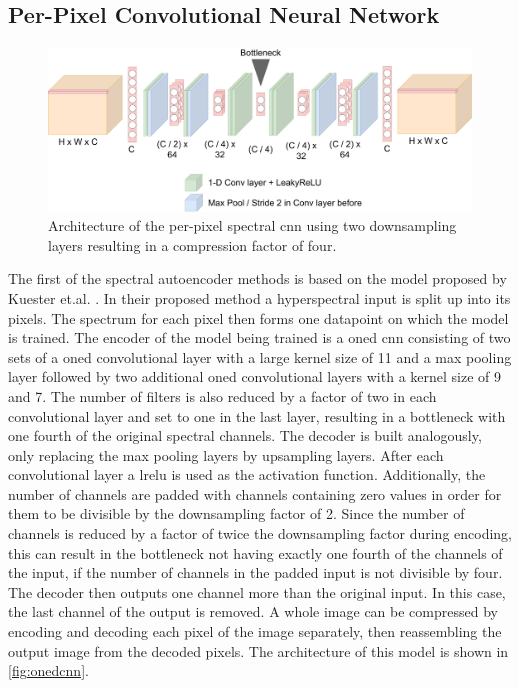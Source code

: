 \subsection{Per-Pixel Convolutional Neural Network\label{sec:conv1d}}
\begin{figure}
\centering
\includegraphics[scale=0.18]{img/OneDCNN.pdf}
\caption[Per-Pixel spectral \ac{cnn}]{Architecture of the per-pixel spectral \ac{cnn} using two downsampling layers resulting in a compression factor of four.}
\label{fig:onedcnn}
\end{figure}
The first of the spectral autoencoder methods is based on the model proposed by Kuester et.al. \citep{kuester_1d-convolutional_2021,kuester_transferability_2022}. In their proposed method a hyperspectral input is split up into its pixels. The spectrum for each pixel then forms one datapoint on which the model is trained. The encoder of the model being trained is a \ac{oned} \ac{cnn} consisting of two sets of a \ac{oned} convolutional layer with a large kernel size of 11 and a max pooling layer followed by two additional \ac{oned} convolutional layers with a kernel size of 9 and 7. The number of filters is also reduced by a factor of two in each convolutional layer and set to one in the last layer, resulting in a bottleneck with one fourth of the original spectral channels. The decoder is built analogously, only replacing the max pooling layers by upsampling layers. After each convolutional layer a \ac{lrelu} is used as the activation function. Additionally, the number of channels are padded with channels containing zero values in order for them to be divisible by the downsampling factor of 2. Since the number of channels is reduced by a factor of twice the downsampling factor during encoding, this can result in the bottleneck not having exactly one fourth of the channels of the input, if the number of channels in the padded input is not divisible by four. The decoder then outputs one channel more than the original input. In this case, the last channel of the output is removed. A whole image can be compressed by encoding and decoding each pixel of the image separately, then reassembling the output image from the decoded pixels. The architecture of this model is shown in \autoref{fig:onedcnn}.

